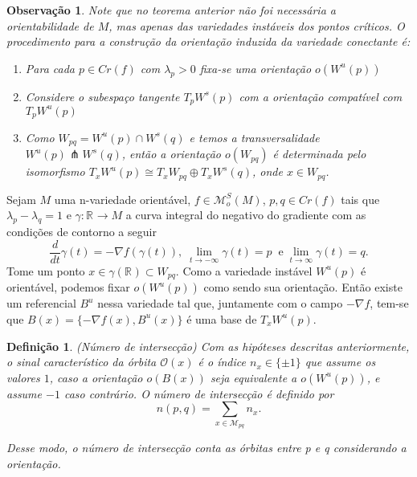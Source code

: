\documentclass[12pt]{book}
\newtheorem{definicao}[teorema]{Definição}
\newtheorem{observacao}[teorema]{Observação}
\newcommand{\derivada}[2]{\frac{d #1}{d #2}}
\newcommand{\espacomoduli}[2]{\mathcal{M}_{#1#2}}
\newcommand{\espacotangenteponto}[2]{T_{#1}#2}
\newcommand{\funcoesmorsesmale}[1]{\mathcal{M}^{S}_{o}(#1)}
\newcommand{\gradiente}{\nabla f}
\newcommand{\orbitaponto}[1]{\mathcal{O}(#1)}
\newcommand{\pontoscriticos}[1]{\textit{Cr}(#1)}
\newcommand{\real}[1]{\mathbb{R}^{#1}}
\newcommand{\reta}{\real{}}
\newcommand{\variedadeconectantepontos}[2]{W_{#1#2}}
\newcommand{\variedadeestavel}[1]{W^{s}(#1)}
\newcommand{\variedadeinstavel}[1]{W^{u}(#1)}
\begin{document}
	\begin{observacao}
		Note que no teorema anterior não foi necessária a orientabilidade de $M$, mas apenas das variedades instáveis dos pontos críticos. O procedimento para a construção da orientação induzida da variedade conectante é:
		\begin{enumerate}
			\item Para cada $p\in \pontoscriticos{f}$ com $\lambda_{p}>0$ fixa-se uma orientação $o(\variedadeinstavel{p})$
			
			\item Considere o subespaço tangente $\espacotangenteponto{p}{\variedadeestavel{p}}$ com a orientação compatível com $\espacotangenteponto{p}{\variedadeinstavel{p}}$
			
			\item Como $\variedadeconectantepontos{p}{q} = \variedadeinstavel{p}\cap\variedadeestavel{q}$ e temos a transversalidade $\variedadeinstavel{p}\pitchfork\variedadeestavel{q}$, então a orientação $o(\variedadeconectantepontos{p}{q})$ é determinada pelo isomorfismo $\espacotangenteponto{x}{\variedadeinstavel{p}}\cong \espacotangenteponto{x}{\variedadeconectantepontos{p}{q}}\oplus \espacotangenteponto{x}{\variedadeestavel{q}}$, onde $x \in \variedadeconectantepontos{p}{q}$.
		\end{enumerate}
	\end{observacao}

	Sejam $M$ uma n-variedade orientável, $f \in \funcoesmorsesmale{M}$, $p,q\in \pontoscriticos{f}$ tais que $\lambda_{p}-\lambda_{q} = 1$ e $\gamma :\reta \to M$ a curva integral do negativo do gradiente com as condições de contorno a seguir
	$$
	\derivada{}{t}\gamma(t) = -\gradiente(\gamma(t)), \; \lim_{t \to -\infty}\gamma(t) = p\;\;\text{e}\; \lim_{t \to \infty}\gamma(t) = q.
	$$
	Tome um ponto $x \in \gamma(\reta) \subset \variedadeconectantepontos{p}{q}$. Como a variedade instável $\variedadeinstavel{p}$ é orientável, podemos fixar $o(\variedadeinstavel{p})$ como sendo sua orientação. Então existe um referencial $B^{u}$ nessa variedade tal que, juntamente com o campo $-\gradiente$, tem-se que $B(x) = \{-\gradiente(x), B^{u}(x)\}$ é uma base de $\espacotangenteponto{x}{\variedadeinstavel{p}}$.
	
	\begin{definicao}
		(Número de intersecção) Com as hipóteses descritas anteriormente, o sinal característico da órbita $\orbitaponto{x}$ é o índice $n_{x} \in \{\pm 1\}$ que assume os valores $1$, caso a orientação $o(B(x))$ seja equivalente a $o(\variedadeinstavel{p})$, e assume $-1$ caso contrário. O número de intersecção é definido por 
		$$
		n(p,q) = \sum_{x \in \espacomoduli{p}{q} }n_{x}.
		$$
		
		Desse modo, o número de intersecção conta as órbitas entre p e q considerando a orientação.
	\end{definicao}
	
\end{document}
